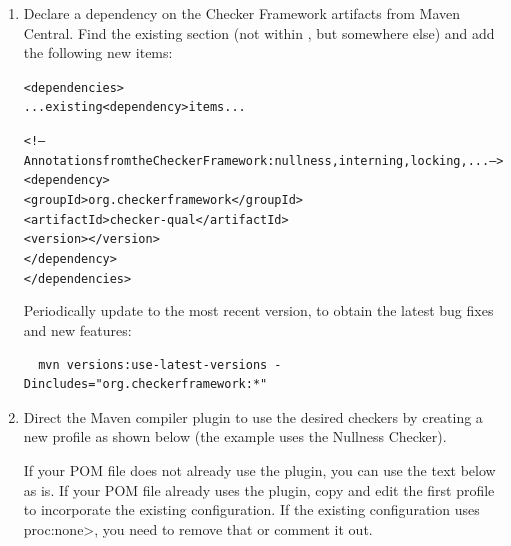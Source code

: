 \begin{enumerate}

\item Declare a dependency on the Checker Framework artifacts from
  Maven Central.  Find the
  existing  section (not within
  , but somewhere else) and add the following new
   items:

\begin{alltt}
  <dependencies>
    ... existing <dependency> items ...

    <!-- Annotations from the Checker Framework: nullness, interning, locking, ... -->
    <dependency>
      <groupId>org.checkerframework</groupId>
      <artifactId>checker-qual</artifactId>
      <version>\ReleaseVersion{}</version>
    </dependency>
  </dependencies>
\end{alltt}

Periodically update to the most recent version, to obtain the
latest bug fixes and new features:
\begin{Verbatim}
  mvn versions:use-latest-versions -Dincludes="org.checkerframework:*"
\end{Verbatim}

\item Direct the Maven compiler plugin to use the desired checkers by
  creating a new profile as shown below (the example uses the Nullness
  Checker).

  If your POM file does not already use the
   plugin, you can use the text below as is.
  If your POM file
  already uses the plugin, copy and edit the first profile to incorporate the
  existing configuration.
  If the existing configuration uses \<proc:none>, you need to remove that
  or comment it out.



\end{enumerate}
